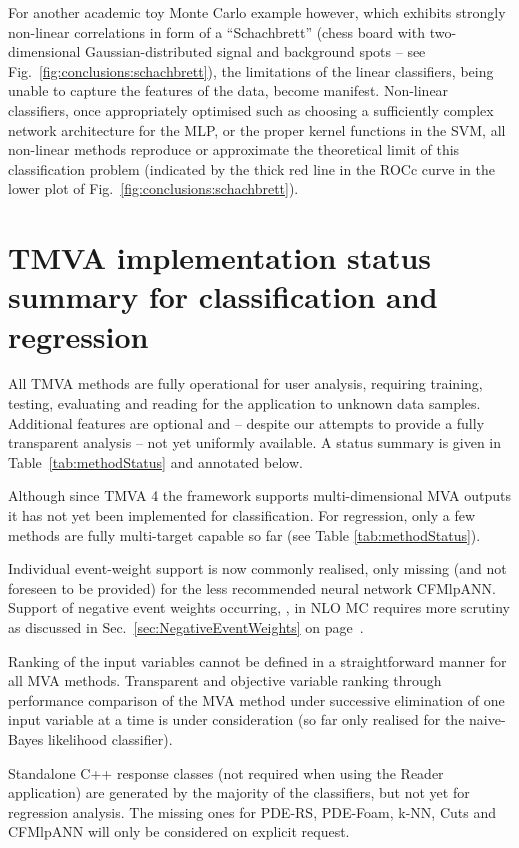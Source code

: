 For another academic toy Monte Carlo example however, which exhibits strongly non-linear 
correlations in form of a ``Schachbrett'' (chess board with two-dimensional 
Gaussian-distributed signal and background spots -- see Fig.~\ref{fig:conclusions:schachbrett}), 
the limitations of the linear classifiers, being unable to capture the features of the data,
become manifest. Non-linear classifiers, once appropriately optimised such as choosing 
a sufficiently complex network architecture for the MLP, or the proper kernel functions 
in the SVM, all non-linear methods reproduce or approximate the theoretical limit of 
this classification problem (indicated by the thick red line in the ROCc curve in 
the lower plot of Fig.~\ref{fig:conclusions:schachbrett}).

\section{TMVA implementation status summary for classification and regression}
\label{sec:classifierSummary}

All TMVA methods are fully operational for user analysis, requiring training, testing,
evaluating and reading for the application to unknown data samples. Additional 
features are optional and -- despite our attempts to provide a fully transparent analysis
-- not yet uniformly available. A status summary is given in Table~\ref{tab:methodStatus}
and annotated below.

Although since TMVA 4 the framework supports multi-dimensional MVA outputs it has not yet 
been implemented for classification. For regression, only a few methods are fully multi-target 
capable so far (see Table \ref{tab:methodStatus}). 

Individual event-weight support is now commonly realised, only missing (and not 
foreseen to be provided) for the less recommended neural network CFMlpANN. Support of
negative event weights occurring, \eg, in NLO MC requires more scrutiny as discussed in 
Sec.~\ref{sec:NegativeEventWeights} on page~\pageref{sec:NegativeEventWeights}.

Ranking of the input variables cannot be defined in a straightforward manner for all 
MVA methods. Transparent and objective variable ranking through performance comparison 
of the MVA method under successive elimination of one input variable at a time is under 
consideration (so far only realised for the naive-Bayes likelihood classifier).

Standalone C++ response classes (not required when using the Reader application) 
are generated by the majority of the classifiers, but not yet for regression analysis. 
The missing ones for PDE-RS, PDE-Foam, k-NN, Cuts and CFMlpANN will only be considered on explicit request.

